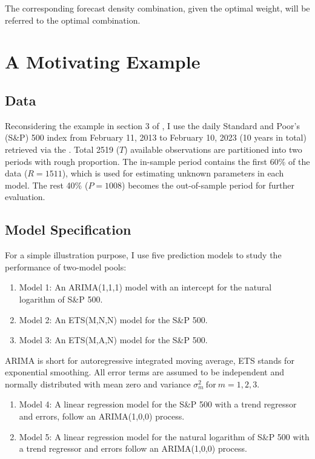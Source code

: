\documentclass{monashthesis}
\begin{document}
The corresponding forecast density combination, given the optimal weight, will be referred to the optimal combination.

\hypertarget{a-motivating-example}{%
\section{A Motivating Example}\label{a-motivating-example}}

\hypertarget{data}{%
\subsection{Data}\label{data}}

Reconsidering the example in section 3 of \textcite{GA11}, I use the daily Standard and Poor's (S\&P) 500 index from February 11, 2013 to February 10, 2023 (10 years in total) retrieved via the \textcite{SP500}. Total 2519 (\(T\)) available observations are partitioned into two periods with rough proportion. The in-sample period contains the first 60\% of the data (\(R = 1511\)), which is used for estimating unknown parameters in each model. The rest 40\% (\(P = 1008\)) becomes the out-of-sample period for further evaluation.

\hypertarget{model}{%
\subsection{Model Specification}\label{model}}

For a simple illustration purpose, I use five prediction models to study the performance of two-model pools:

\begin{enumerate}
\def\labelenumi{\arabic{enumi}.}
\tightlist
\item
  Model 1: An ARIMA(1,1,1) model with an intercept for the natural logarithm of S\&P 500.
\item
  Model 2: An ETS(M,N,N) model for the S\&P 500.
\item
  Model 3: An ETS(M,A,N) model for the S\&P 500.
\end{enumerate}

ARIMA is short for autoregressive integrated moving average, ETS stands for exponential smoothing. All error terms are assumed to be independent and normally distributed with mean zero and variance \(\sigma_m^2 \ \text{for}\  m = 1,2,3\).

\begin{enumerate}
\def\labelenumi{\arabic{enumi}.}
\setcounter{enumi}{3}
\tightlist
\item
  Model 4: A linear regression model for the S\&P 500 with a trend regressor and errors, follow an ARIMA(1,0,0) process.
\item
  Model 5: A linear regression model for the natural logarithm of S\&P 500 with a trend regressor and errors follow an ARIMA(1,0,0) process.
\end{enumerate}
\end{document}
